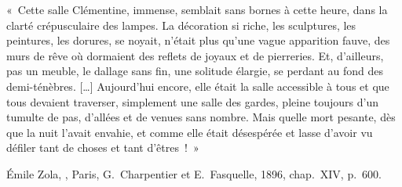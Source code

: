 \begin{teiElement}[name={TEI},change={commons\_edition}]
\begin{teiElement}[name={text},type={book},xmlid={book}]
\begin{teiElement}[name={group},type={book},xmlid={book-001}]
\begin{teiElement}[name={group},type={section1},xmlid={section1-016}]
\begin{teiElement}
\end{teiElement}
        \begin{teiElement}[name={group},type={chapter},data-page-title={Apothéoses armoriales dans la Rome baroque},data-page-subtitle={De Clément VIII Aldobrandini à Clément X Altieri},data-page-authors={Frédéric Cousinié},data-include-href={Ch13\_Apotheoses\_armoriales.xml},xmlid={chapter-010}]

          \begin{teiElement}[name={front}]

            \begin{teiDiv}[type={titlePage},xmlid={titlepage-015}]

            
\end{teiDiv}
            \begin{teiElement}[name={epigraph}]

              \begin{teiCit}

                \begin{teiQuote}
« Cette salle Clémentine, immense, semblait sans bornes à cette heure, dans la clarté crépusculaire des lampes. La décoration si riche, les sculptures, les peintures, les dorures, se noyait, n’était plus qu’une vague apparition fauve, des murs de rêve où dormaient des reflets de joyaux et de pierreries. Et, d’ailleurs, pas un meuble, le dallage sans fin, une solitude élargie, se perdant au fond des demi-ténèbres. […] Aujourd’hui encore, elle était la salle accessible à tous et que tous devaient traverser, simplement une salle des gardes, pleine toujours d’un tumulte de pas, d’allées et de venues sans nombre. Mais quelle mort pesante, dès que la nuit l’avait envahie, et comme elle était désespérée et lasse d’avoir vu défiler tant de choses et tant d’êtres ! »
\end{teiQuote}
                \begin{teiBibl}[xmlid={bibl-008}]
Émile Zola, , Paris, G. Charpentier et E. Fasquelle, 1896, chap. XIV, p. 600.
\end{teiBibl}
              
\end{teiCit}
            

\end{teiElement}
\end{teiElement}
\end{teiElement}
\end{teiElement}
\end{teiElement}
\end{teiElement}
\end{teiElement}
